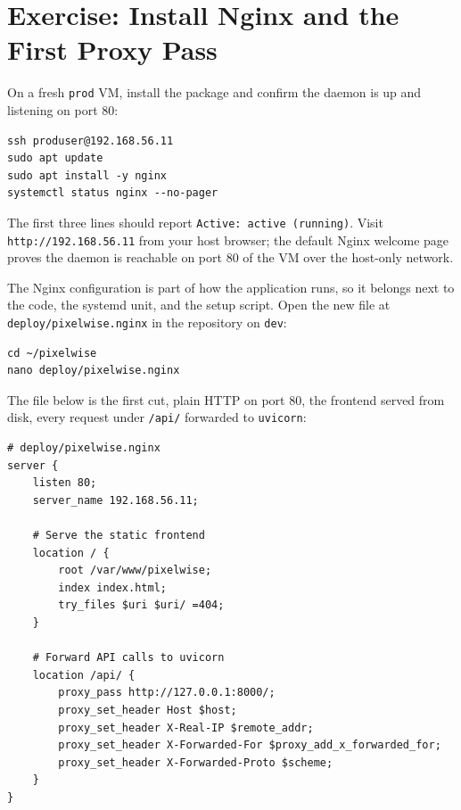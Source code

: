 \newpage
\section{Exercise: Install Nginx and the First Proxy Pass}

On a fresh \texttt{prod} VM, install the package and confirm the daemon
is up and listening on port 80:

\begin{verbatim}
ssh produser@192.168.56.11
sudo apt update
sudo apt install -y nginx
systemctl status nginx --no-pager
\end{verbatim}


The first three lines should report \texttt{Active: active (running)}.
Visit \texttt{http://192.168.56.11} from your host browser; the default
Nginx welcome page proves the daemon is reachable on port 80 of the VM
over the host-only network.

The Nginx configuration is part of how the application runs, so it
belongs next to the code, the systemd unit, and the setup script.
Open the new file at \texttt{deploy/pixelwise.nginx} in the repository
on \texttt{dev}:

\begin{verbatim}
cd ~/pixelwise
nano deploy/pixelwise.nginx
\end{verbatim}

The file below is the first cut, plain HTTP on port 80, the frontend
served from disk, every request under \texttt{/api/} forwarded to
\texttt{uvicorn}:

\begin{verbatim}
# deploy/pixelwise.nginx
server {
    listen 80;
    server_name 192.168.56.11;

    # Serve the static frontend
    location / {
        root /var/www/pixelwise;
        index index.html;
        try_files $uri $uri/ =404;
    }

    # Forward API calls to uvicorn
    location /api/ {
        proxy_pass http://127.0.0.1:8000/;
        proxy_set_header Host $host;
        proxy_set_header X-Real-IP $remote_addr;
        proxy_set_header X-Forwarded-For $proxy_add_x_forwarded_for;
        proxy_set_header X-Forwarded-Proto $scheme;
    }
}
\end{verbatim}

